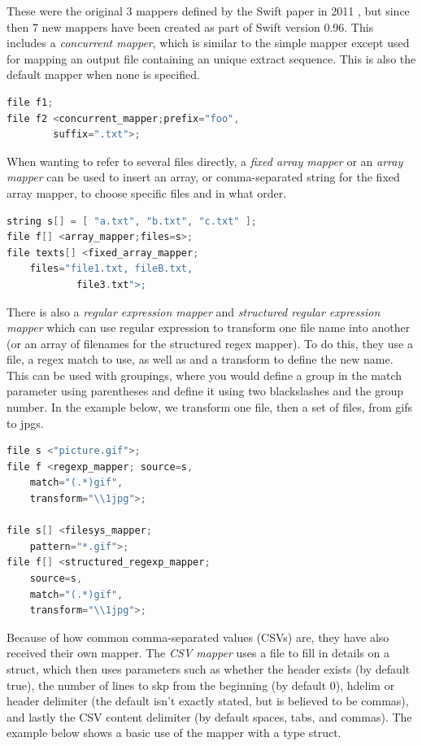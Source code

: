         These were the original 3 mappers defined by the Swift paper in 2011 \cite{wilde2011swift}, but since then 7 new mappers have been created as part of Swift version 0.96. This includes a \textit{concurrent mapper}, which is similar to the simple mapper except used for mapping an output file containing an unique extract sequence. This is also the default mapper when none is specified.

        \begin{lstlisting}[language=swift]
file f1;
file f2 <concurrent_mapper;prefix="foo",
        suffix=".txt">;
        \end{lstlisting}

        When wanting to refer to several files directly, a \textit{fixed array mapper} or an \textit{array mapper} can be used to insert an array, or comma-separated string for the fixed array mapper, to choose specific files and in what order.

        \begin{lstlisting}[language=swift]
string s[] = [ "a.txt", "b.txt", "c.txt" ];
file f[] <array_mapper;files=s>;
file texts[] <fixed_array_mapper;
    files="file1.txt, fileB.txt,
            file3.txt">;
        \end{lstlisting}

        There is also a \textit{regular expression mapper} and \textit{structured regular expression mapper} which can use regular expression to transform one file name into another (or an array of filenames for the structured regex mapper). To do this, they use a file, a regex match to use, as well as and a transform to define the new name. This can be used with groupings, where you would define a group in the match parameter using parentheses and define it using two blackslashes and the group number. In the example below, we transform one file, then a set of files, from gifs to jpgs.

        \begin{lstlisting}[language=swift]
file s <"picture.gif">;
file f <regexp_mapper; source=s,
    match="(.*)gif",
    transform="\\1jpg">;

file s[] <filesys_mapper;
    pattern="*.gif">;
file f[] <structured_regexp_mapper;
    source=s,
    match="(.*)gif",
    transform="\\1jpg">;
        \end{lstlisting}

        Because of how common comma-separated values (CSVs) are, they have also received their own mapper. The \textit{CSV mapper} uses a file to fill in details on a struct, which then uses parameters such as whether the header exists (by default true), the number of lines to skp from the beginning (by default 0), hdelim or header delimiter (the default isn't exactly stated, but is believed to be commas), and lastly the CSV content delimiter (by default spaces, tabs, and commas). The example below shows a basic use of the mapper with a type struct.


